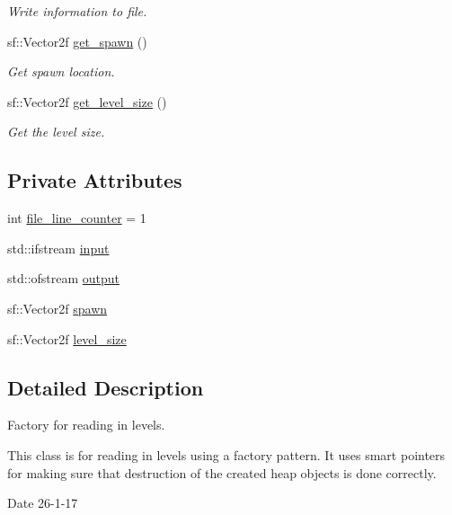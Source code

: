 \begin{DoxyCompactItemize}
\begin{DoxyCompactList}\small\item\em Write information to file. \end{DoxyCompactList}\item 
sf\+::\+Vector2f \hyperlink{classfactory_a3c3a039b8f76a947267dbe659166550b}{get\+\_\+spawn} ()
\begin{DoxyCompactList}\small\item\em Get spawn location. \end{DoxyCompactList}\item 
sf\+::\+Vector2f \hyperlink{classfactory_af9bb026273b34fc032ca5ac73d457611}{get\+\_\+level\+\_\+size} ()
\begin{DoxyCompactList}\small\item\em Get the level size. \end{DoxyCompactList}\end{DoxyCompactItemize}
\subsection*{Private Attributes}
\begin{DoxyCompactItemize}
\item 
int \hyperlink{classfactory_af33b0e5fcc396c359d30a00afacb819b}{file\+\_\+line\+\_\+counter} = 1
\item 
std\+::ifstream \hyperlink{classfactory_a9a874663e858e01c8ff372c070b8c19e}{input}
\item 
std\+::ofstream \hyperlink{classfactory_a0454b8bf0f45196f436ddf3febc422f3}{output}
\item 
sf\+::\+Vector2f \hyperlink{classfactory_a891028263226aa493299e51f767211a1}{spawn}
\item 
sf\+::\+Vector2f \hyperlink{classfactory_a29d1328317de4563aefb5c2f32f63424}{level\+\_\+size}
\end{DoxyCompactItemize}


\subsection{Detailed Description}
Factory for reading in levels. 

This class is for reading in levels using a factory pattern. It uses smart pointers for making sure that destruction of the created heap objects is done correctly. \begin{DoxyDate}{Date}
26-\/1-\/17 
\end{DoxyDate}


